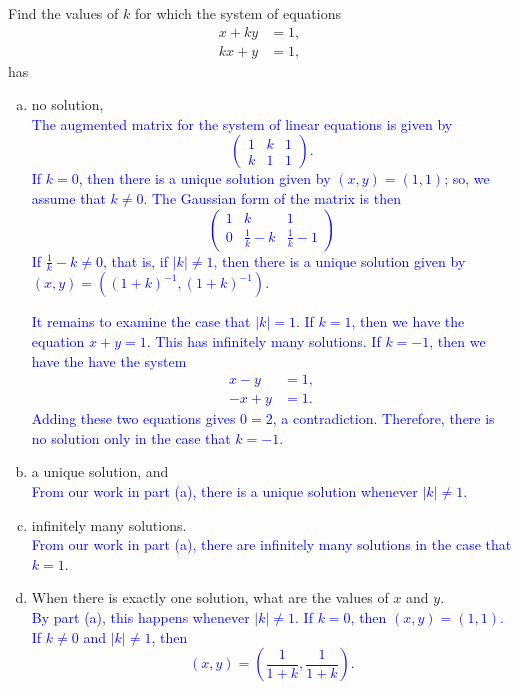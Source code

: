 \documentclass[a4paper,11pt]{article}
\newcommand{\BB}[1]{\textcolor{blue}{#1}}
\newcommand{\abs}[1]{\vert #1 \vert}
\begin{document}
 Find the values of $k$ for which the system of
equations
\begin{align*}
  x + ky &= 1, \\
  kx + y &= 1,
\end{align*}
has
\begin{enumerate}[(a)]
\item no solution, \\

  \BB{
    The augmented matrix for the system of linear equations is given by
    \[
      \left(
        \begin{array}{rr|r}
          1 & k & 1 \\
          k & 1 & 1
        \end{array}
      \right).
    \]
    If $k=0$, then there is a unique solution given by $(x,y)=(1,1)$; so, we
    assume that $k \neq 0$. The Gaussian form of the matrix is then
    \[
      \left(
        \begin{array}{rr|r}
          1 & k & 1 \\
          0 & \frac{1}{k}-k & \frac{1}{k}-1
        \end{array}
      \right)
    \]
    If $\frac{1}{k}-k \neq 0$, that is, if $\abs{k} \neq 1$, then there is a
    unique solution given by $(x,y) = ((1+k)^{-1},(1+k)^{-1})$.
  }

  \BB{
    It remains to examine the case that $\abs{k}=1$. If $k=1$, then we have the
    equation $x+y=1$. This has infinitely many solutions. If $k=-1$, then we
    have the have the system
    \begin{align*}
      x-y &= 1, \\
      -x+y &= 1.
    \end{align*}
    Adding these two equations gives $0=2$, a contradiction. Therefore, there
    is no solution only in the case that $k=-1$. \\
  }
  
\item a unique solution, and \\

  \BB{
    From our work in part (a), there is a unique solution whenever $\abs{k} \neq
    1$. \\
  }

\item infinitely many solutions. \\

  \BB{
    From our work in part (a), there are infinitely many solutions in the case
    that $k=1$. \\
  }
  
\item When there is exactly one solution, what are the values of $x$ and $y$. \\

  \BB{
    By part (a), this happens whenever $\abs{k} \neq 1$. If $k=0$, then
    $(x,y)=(1,1)$. If $k \neq 0$ and $\abs{k} \neq 1$, then 
    \[
      (x,y) = \left( \frac{1}{1+k}, \frac{1}{1+k} \right).
    \] \\
  }
\end{enumerate}
\end{document}
